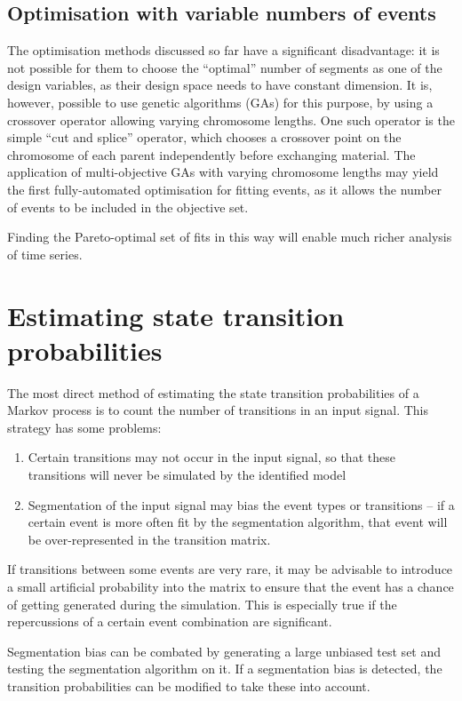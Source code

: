 \subsection{Optimisation with variable numbers of events}
The optimisation methods discussed so far have a significant
disadvantage: it is not possible for them to choose the ``optimal''
number of segments as one of the design variables, as their design space
needs to have constant dimension. It is, however, possible to use
genetic algorithms (GAs) for this purpose, by using a crossover
operator allowing varying chromosome lengths.  One such operator is
the simple ``cut and splice'' operator, which chooses a crossover
point on the chromosome of each parent independently before exchanging
material.  The application of multi-objective GAs with varying
chromosome lengths may yield the first fully-automated optimisation
for fitting events, as it allows the number of events to be included
in the objective set.

Finding the Pareto-optimal set of fits in this way will enable much
richer analysis of time series.

\section{Estimating state transition probabilities}
The most direct method of estimating the state transition
probabilities of a Markov process is to count the number of
transitions in an input signal.  This strategy has some problems:
\begin{enumerate}
\item Certain transitions may not occur in the input signal, so that
  these transitions will never be simulated by the identified model
\item Segmentation of the input signal may bias the event types or
  transitions -- if a certain event is more often fit by the
  segmentation algorithm, that event will be over-represented in the
  transition matrix.
\end{enumerate}

If transitions between some events are very rare, it may be advisable
to introduce a small artificial probability into the matrix to ensure
that the event has a chance of  getting generated during the
simulation.  This is especially true if the repercussions of a certain
event combination are significant.  

Segmentation bias can be combated by generating a large unbiased test
set and testing the segmentation algorithm on it.  If a segmentation
bias is detected, the transition probabilities can be modified to take
these into account.

